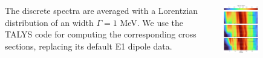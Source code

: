 \documentclass[25pt, a0paper, portrait]{tikzposter}
\begin{document}
\begin{columns}
{	The discrete spectra are averaged with a Lorentzian distribution of an width $\Gamma = 1 $ MeV.
	We use the
    TALYS code for computing the corresponding cross sections, replacing its default
    E1 dipole data.
}

    {
        \begin{tikzfigure}
            \includegraphics[width=0.4\textwidth]{images/colormesh.pdf}
        \end{tikzfigure}
    }







\end{columns}
\end{document}

